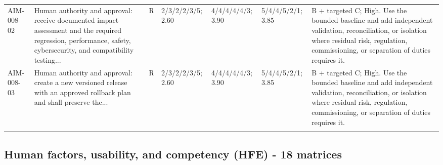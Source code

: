 \documentclass[11pt,letterpaper]{article}
\begin{document}
\begin{scriptsize}
\begin{longtable}{@{}L{0.11\textwidth}L{0.165\textwidth}L{0.04\textwidth}L{0.115\textwidth}L{0.115\textwidth}L{0.115\textwidth}L{0.235\textwidth}@{}}
\addlinespace[2pt]
AIM-008-02 & Human authority and approval: receive documented impact assessment and the required regression, performance, safety, cybersecurity, and compatibility testing... & R & 2/3/2/2/3/5; 2.60 & 4/4/4/4/4/3; 3.90 & 5/4/4/5/2/1; 3.85 & B + targeted C; High. Use the bounded baseline and add independent validation, reconciliation, or isolation where residual risk, regulation, commissioning, or separation of duties requires it. \\
\addlinespace[2pt]
AIM-008-03 & Human authority and approval: create a new versioned release with an approved rollback plan and shall preserve the... & R & 2/3/2/2/3/5; 2.60 & 4/4/4/4/4/3; 3.90 & 5/4/4/5/2/1; 3.85 & B + targeted C; High. Use the bounded baseline and add independent validation, reconciliation, or isolation where residual risk, regulation, commissioning, or separation of duties requires it. \\
\addlinespace[2pt]
\end{longtable}
\end{scriptsize}

\subsection{Human factors, usability, and competency (HFE) - 18 matrices}
\end{document}
